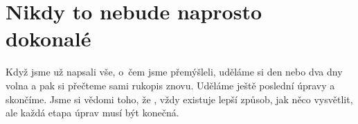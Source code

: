 \chapter{Nikdy to nebude naprosto dokonalé}
Když jsme už napsali vše, o~čem jsme přemýšleli, uděláme si den nebo dva dny volna a pak si přečteme sami rukopis znovu.
Uděláme ještě poslední úpravy a skončíme.
Jsme si vědomi toho, že , vždy existuje lepší způsob, jak něco vysvětlit, ale každá etapa úprav musí být konečná.
